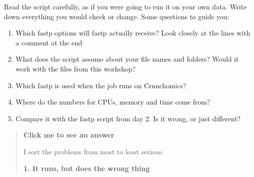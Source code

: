 \documentclass[
  letterpaper,
  DIV=11,
  numbers=noendperiod]{scrreprt}
\providecommand{\tightlist}{%
  \setlength{\itemsep}{0pt}\setlength{\parskip}{0pt}}
\begin{document}
\begin{tcolorbox}[enhanced jigsaw, title=\textcolor{quarto-callout-color}{\faInfo}\hspace{0.5em}{Exercise}, rightrule=.15mm, titlerule=0mm, colframe=quarto-callout-color-frame, toprule=.15mm, leftrule=.75mm, colbacktitle=quarto-callout-color!10!white, bottomtitle=1mm, toptitle=1mm, arc=.35mm, opacitybacktitle=0.6, left=2mm, bottomrule=.15mm, breakable, opacityback=0, colback=white, coltitle=black]

Read the script carefully, as if you were going to run it on your own
data. Write down everything you would check or change. Some questions to
guide you:

\begin{enumerate}
\def\labelenumi{\arabic{enumi}.}
\tightlist
\item
  Which fastp options will fastp actually receive? Look closely at the
  lines with a comment at the end
\item
  What does the script assume about your file names and folders? Would
  it work with the files from this workshop?
\item
  Which fastp is used when the job runs on Crunchomics?
\item
  Where do the numbers for CPUs, memory and time come from?
\item
  Compare it with the fastp script from day 2. Is it wrong, or just
  different?
\end{enumerate}

\begin{quote}
\textbf{Click me to see an answer}

I sort the problems from most to least serious.

\textbf{1. It runs, but does the wrong thing}


\end{quote}
\end{tcolorbox}
\end{document}
